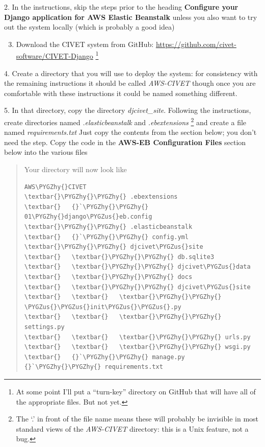 \documentclass[letterpaper,10pt,english]{sphinxmanual}
\def\PYGZus{\char`\_}
\def\PYGZhy{\char`\-}
\begin{document}
2. In the instructions, skip the steps prior to the
heading \textbf{Configure your Django application for AWS Elastic Beanstalk} unless you also want to try out the system
locally (which is probably a good idea)
\begin{enumerate}
\setcounter{enumi}{2}
\item {} 
Download the CIVET system from GitHub: \href{https://github.com/civet-software/CIVET-Django}{https://github.com/civet-software/CIVET-Django} \footnote{
At some point I'll put a “turn-key” directory on GitHub that will have all of the appropriate files. But not yet.
}

\end{enumerate}

4. Create a directory that you will use to deploy the system: for consistency with the remaining instructions it should be
called \emph{AWS-CIVET} though once you are comfortable with these instructions it could be named something different.

5. In that directory, copy the directory \emph{djcivet\_site}. Following the instructions, create directories named \emph{.elasticbeanstalk}
and \emph{.ebextensions} \footnote{
The ‘.’ in front of the file name means these will probably be invisible in most standard views of the \emph{AWS-CIVET}
directory: this is a Unix feature, not a bug.
}
and create a file named \emph{requirements.txt} Just copy the contents from the section below; you don't need the 
step. Copy the code in the \textbf{AWS-EB Configuration Files} section below into the various files
\begin{quote}

Your directory will now look like

\begin{Verbatim}[commandchars=\\\{\}]
AWS\PYGZhy{}CIVET
\textbar{}\PYGZhy{}\PYGZhy{} .ebextensions
\textbar{}   {}`\PYGZhy{}\PYGZhy{} 01\PYGZhy{}django\PYGZus{}eb.config
\textbar{}\PYGZhy{}\PYGZhy{} .elasticbeanstalk
\textbar{}   {}`\PYGZhy{}\PYGZhy{} config.yml
\textbar{}\PYGZhy{}\PYGZhy{} djcivet\PYGZus{}site
\textbar{}   \textbar{}\PYGZhy{}\PYGZhy{} db.sqlite3
\textbar{}   \textbar{}\PYGZhy{}\PYGZhy{} djcivet\PYGZus{}data
\textbar{}   \textbar{}\PYGZhy{}\PYGZhy{} docs
\textbar{}   \textbar{}\PYGZhy{}\PYGZhy{} djcivet\PYGZus{}site
\textbar{}   \textbar{}   \textbar{}\PYGZhy{}\PYGZhy{} \PYGZus{}\PYGZus{}init\PYGZus{}\PYGZus{}.py
\textbar{}   \textbar{}   \textbar{}\PYGZhy{}\PYGZhy{} settings.py
\textbar{}   \textbar{}   \textbar{}\PYGZhy{}\PYGZhy{} urls.py
\textbar{}   \textbar{}   \textbar{}\PYGZhy{}\PYGZhy{} wsgi.py
\textbar{}   {}`\PYGZhy{}\PYGZhy{} manage.py
{}`\PYGZhy{}\PYGZhy{} requirements.txt
\end{Verbatim}
\end{quote}
\end{document}
